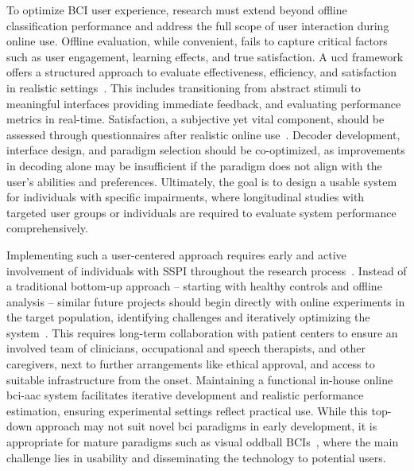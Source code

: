 \documentclass[twocolumn]{article}
\begin{document}
To optimize BCI user experience, research must extend beyond offline classification
performance and address the full scope of user interaction during online use.
Offline evaluation, while convenient, fails to capture critical factors such as
user engagement, learning effects, and true satisfaction.
A \ac{ucd} framework offers a structured approach to evaluate
effectiveness, efficiency, and satisfaction in realistic
settings~\cite{Standardization2009,Schreuder2013,Kuebler2014,Han2022}.
This includes transitioning from abstract stimuli to meaningful interfaces
providing immediate feedback, and evaluating performance metrics in real-time.
Satisfaction, a subjective yet vital component, should be assessed through
questionnaires after realistic online use~\cite{Kuebler2014}.
Decoder development, interface design, and paradigm selection should be
co-optimized, as improvements in decoding alone may be insufficient if the
paradigm does not align with the user’s abilities and preferences.
Ultimately, the goal is to design a usable system for individuals with
specific impairments, where longitudinal studies with targeted user groups or
individuals are required to evaluate system performance comprehensively.

Implementing such a user-centered approach requires early and active involvement
of individuals with SSPI throughout the research process~\cite{Standardization2009}.
Instead of a traditional bottom-up approach -- starting with healthy controls and
offline analysis -- similar future projects should begin directly with online experiments
in the target population, identifying challenges and iteratively optimizing the
system~\cite{FriedOken2020}.
This requires long-term collaboration with patient centers to ensure an involved
team of clinicians, occupational and speech therapists, and other caregivers, next to
further arrangements like ethical approval, and access to suitable infrastructure
from the onset.
Maintaining a functional in-house online \ac{bci}-\ac{aac} system facilitates iterative
development and realistic performance estimation, ensuring experimental settings
reflect practical use.
While this top-down approach may not suit novel \ac{bci} paradigms in early
development, it is appropriate for mature paradigms such as visual oddball
BCIs~\cite{Pan2022,Fouad2020}, where the main challenge lies in usability and
disseminating the technology to potential users.

\acresetall
\end{document}
